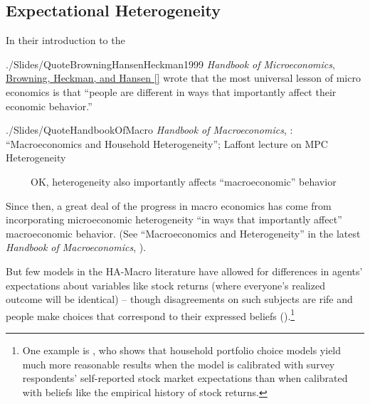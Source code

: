 \subsection{Expectational Heterogeneity}\label{EpiExpHet}
In their introduction to the
\begin{verbatimwrite}{./Slides/QuoteBrowningHansenHeckman1999}
  \textit{Handbook of Microeconomics}, \href{http://larspeterhansen.org/wp-content/uploads/2016/11/Microdata-and-GE-Models.pdf}{Browning, Heckman, and Hansen [\citeyear{browning_chapter_1999}]} wrote that the most universal lesson of micro economics is that ``people are different in ways that importantly affect their economic behavior.''
\end{verbatimwrite}

\begin{verbatimwrite}{./Slides/QuoteHandbookOfMacro}
  \textit{Handbook of Macroeconomics}, \cite{kmpHandbook}: ``Macroeconomics and Household Heterogeneity'';  \cite{violante_marginal_2021} Laffont lecture on MPC Heterogeneity

  \pause \indent ~~~~~OK, heterogeneity also importantly affects ``macroeconomic'' behavior
\end{verbatimwrite}
Since then, a great deal of the progress in macro economics has come from incorporating microeconomic heterogeneity ``in ways that importantly affect'' macroeconomic behavior.  (See ``Macroeconomics and Heterogeneity'' in the latest \textit{Handbook of Macroeconomics}, \cite{kmpHandbook}).  


But few models in the HA-Macro literature have allowed for differences in agents' expectations about variables like stock returns (where everyone's realized outcome will be identical) -- though disagreements on such subjects are rife and people make choices that correspond to their expressed beliefs (\cite{gmsuBeliefs}).\footnote{One example is \cite{Velasquez2022}, who shows that household portfolio choice models yield much more reasonable results when the model is calibrated with survey respondents' self-reported stock market expectations than when calibrated with beliefs like the empirical history of stock returns.}



